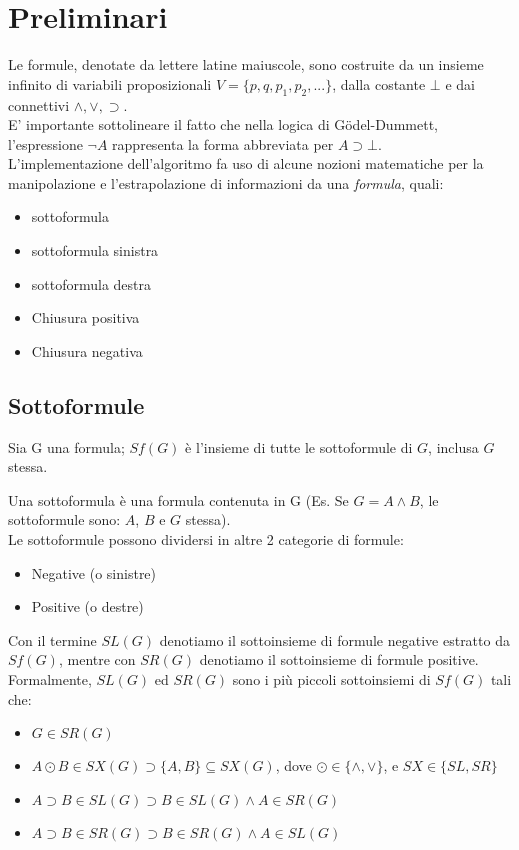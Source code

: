 \documentclass[\main/tesi.tex]{subfiles}
\begin{document}
\chapter{Preliminari}

Le formule, denotate da lettere latine maiuscole, sono costruite da un insieme infinito di variabili proposizionali $V = \{p,q,p_1,p_2,...\}$, dalla costante $\bot$ e dai connettivi $\land, \lor, \supset$. \\
E' importante sottolineare il fatto che nella logica di G\"odel-Dummett, l'espressione $\neg A$ rappresenta la forma abbreviata per $A \supset \bot$. \\

L'implementazione dell'algoritmo fa uso di alcune nozioni matematiche per la manipolazione e l'estrapolazione di informazioni da una \textit{formula}, quali: \\
\begin{itemize}
    \item sottoformula
    \item sottoformula sinistra
    \item sottoformula destra
    \item Chiusura positiva
    \item Chiusura negativa
\end{itemize}

\newpage

\section{Sottoformule}

Sia G una formula; $Sf(G)$ è l'insieme di tutte le sottoformule di $G$, inclusa $G$ stessa.

Una sottoformula è una formula contenuta in G (Es. Se $G = A \land B$, le sottoformule sono: $A$, $B$ e $G$ stessa). \\
Le sottoformule possono dividersi in altre 2 categorie di formule:
\begin{itemize}
    \item Negative (o sinistre)
    \item Positive (o destre)
\end{itemize}

Con il termine $SL(G)$ denotiamo il sottoinsieme di formule negative estratto da $Sf(G)$, mentre con $SR(G)$ denotiamo il sottoinsieme di formule positive. \\
Formalmente, $SL(G)$ ed $SR(G)$ sono i più piccoli sottoinsiemi di $Sf(G)$ tali che:
\begin{itemize}
    \item $G \in SR(G)$
    \item $A \odot B \in SX(G) \supset \{A, B\} \subseteq SX(G)$, dove $\odot \in \{\land, \lor\}$, e $SX \in \{SL, SR\}$
    \item $A \supset B \in SL(G) \supset B \in SL(G) \land A \in SR(G)$
    \item $A \supset B \in SR(G) \supset B \in SR(G) \land A \in SL(G)$
\end{itemize}
\end{document}
